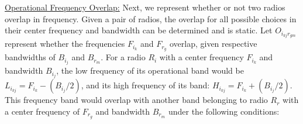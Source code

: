 %
%
%
%

\vspace{0.1in}
\uline{Operational Frequency Overlap:} Next, we represent whether or not two radios overlap in frequency.  Given a pair of radios, the overlap for all possible choices in their center frequency and bandwidth can be determined and is static.  Let $O_{i_{kj}r_{gm}}$ represent whether the frequencies $F_{i_k}$ and $F_{r_g}$ overlap, given respective bandwidths of $B_{i_j}$ and $B_{r_m}$.  For a radio $R_i$ with a center frequency $F_{i_k}$ and bandwidth $B_{i_j}$, the low frequency of its operational band would be $L_{i_{kj}} = F_{i_k} - (B_{i_j}/2)$, and its high frequency of its band: $H_{i_{kj}} = F_{i_k} + (B_{i_j}/2)$.  This frequency band would overlap with another band belonging to radio $R_r$ with a center frequency of $F_{r_g}$ and bandwidth $B_{r_m}$ under the following conditions:

